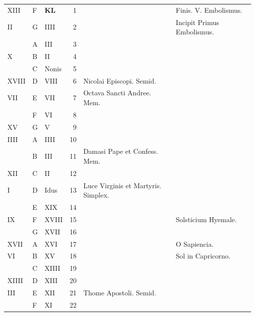 \documentclass[11pt,openany]{book}
\begin{document}
\begin{center}
\begin{tabular}{l | l | l | r | l l}
\color{Red} XIII & F & \textbf{\color{Red} K\color{Blue}L} & 1 & & \color{Red} Finis. V. Embolismus. \\
\color{Red} II & G & \color{Red} IIII & 2 & & \color{Red} Incipit Primus Embolismus. \\
\color{Red}  & \color{Red} A & \color{Red} III & 3 & & \color{Red} \\
\color{Red} X & B & \color{Red} II & 4 & & \color{Red} \\
\color{Red}  & C & \color{Red} Nonis & 5 & & \color{Red} \\
\color{Red} XVIII & D & \color{Red} VIII & 6 & \color{Red} Nicolai Episcopi. Semid. & \color{Red} \\
\color{Red} VII & E & \color{Red} VII & 7 & \color{Red} Octava Sancti Andree. Mem. \\
\color{Red}  & F & \color{Red} VI & 8 & & \color{Red} \\
\color{Red} XV & G & \color{Red} V & 9 &  & \color{Red} \\
\color{Red} IIII & \color{Red} A & \color{Red} IIII & 10 &  & \color{Red} \\
\color{Red}  & B & \color{Red} III & 11 & Damasi Pape et Confess. Mem. & \color{Red} \\
\color{Red} XII & C & \color{Red} II & 12 &  & \color{Red} \\
\color{Red} I & D & \color{Red} Idus & 13 & Luce Virginis et Martyris. Simplex. & \color{Red} \\
\color{Red}  & E & \color{Red} XIX & 14 &  & \color{Red} \\
\color{Red} IX & F & \color{Red} XVIII & 15 & & \color{Red} Solsticium Hyemale. \\
\color{Red}  & G & \color{Red} XVII & 16 & & \color{Red} \\
\color{Red} XVII & \color{Red} A & \color{Red} XVI & 17 & & O Sapiencia. \color{Red} \\
\color{Red} VI & B & \color{Red} XV & 18 & & \color{Red} Sol in Capricorno. \\
\color{Red}  & C & \color{Red} XIIII & 19 & & \color{Red} \\
\color{Red} XIIII & D & \color{Red} XIII & 20 & & \color{Red} \\
\color{Red} III & E & \color{Red} XII & 21 & Thome Apostoli. Semid. & \color{Red} \\
\color{Red}  & F & \color{Red} XI & 22 & & \color{Red} \\

\end{tabular}
\end{center}
\end{document}
